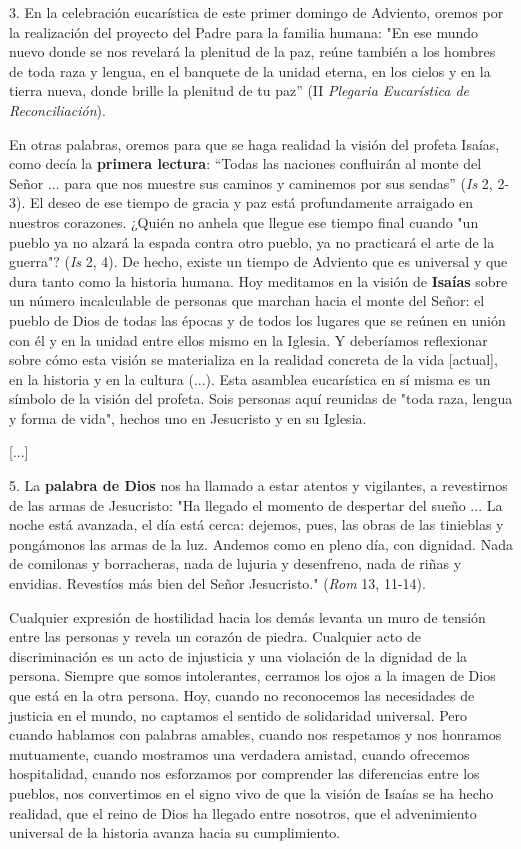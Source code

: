 \begin{body}
	3. En la celebración eucarística de este primer domingo de Adviento, oremos por la realización del proyecto del Padre para la familia humana: "En ese mundo nuevo donde se nos revelará la plenitud de la paz, reúne también a los hombres de toda raza y lengua, en el banquete de la unidad eterna, en los cielos y en la tierra nueva, donde brille la plenitud de tu paz'' (II \emph{Plegaria Eucarística de Reconciliación}).
	
	En otras palabras, oremos para que se haga realidad la visión del profeta Isaías, como decía la \textbf{primera lectura}: ``Todas las naciones confluirán al monte del Señor ... para que nos muestre sus caminos y caminemos por sus sendas'' (\emph{Is} 2, 2-3). El deseo de ese tiempo de gracia y paz está profundamente arraigado en nuestros corazones. ¿Quién no anhela que llegue ese tiempo final cuando "un pueblo ya no alzará la espada contra otro pueblo, ya no practicará el arte de la guerra"? (\emph{Is} 2, 4). De hecho, existe un tiempo de Adviento que es universal y que dura tanto como la historia humana. Hoy meditamos en la visión de \textbf{Isaías} sobre un número incalculable de personas que marchan hacia el monte del Señor: el pueblo de Dios de todas las épocas y de todos los lugares que se reúnen en unión con él y en la unidad entre ellos mismo en la Iglesia. Y deberíamos reflexionar sobre cómo esta visión se materializa en la realidad concreta de la vida {[}actual{]}, en la historia y en la cultura (...). Esta asamblea eucarística en sí misma es un símbolo de la visión del profeta. Sois personas aquí reunidas de "toda raza, lengua y forma de vida", hechos uno en Jesucristo y en su Iglesia.
	
	{[}...{]}
	
	5. La \textbf{palabra de Dios} nos ha llamado a estar atentos y vigilantes, a revestirnos de las armas de Jesucristo: "Ha llegado el momento de despertar del sueño ... La noche está avanzada, el día está cerca: dejemos, pues, las obras de las tinieblas y pongámonos las armas de la luz. Andemos como en pleno día, con dignidad. Nada de comilonas y borracheras, nada de lujuria y desenfreno, nada de riñas y envidias. Revestíos más bien del Señor Jesucristo." (\emph{Rom} 13, 11-14).
	
	Cualquier expresión de hostilidad hacia los demás levanta un muro de tensión entre las personas y revela un corazón de piedra. Cualquier acto de discriminación es un acto de injusticia y una violación de la dignidad de la persona. Siempre que somos intolerantes, cerramos los ojos a la imagen de Dios que está en la otra persona. Hoy, cuando no reconocemos las necesidades de justicia en el mundo, no captamos el sentido de solidaridad universal. Pero cuando hablamos con palabras amables, cuando nos respetamos y nos honramos mutuamente, cuando mostramos una verdadera amistad, cuando ofrecemos hospitalidad, cuando nos esforzamos por comprender las diferencias entre los pueblos, nos convertimos en el signo vivo de que la visión de Isaías se ha hecho realidad, que el reino de Dios ha llegado entre nosotros, que el advenimiento universal de la historia avanza hacia su cumplimiento.
	

\end{body}
